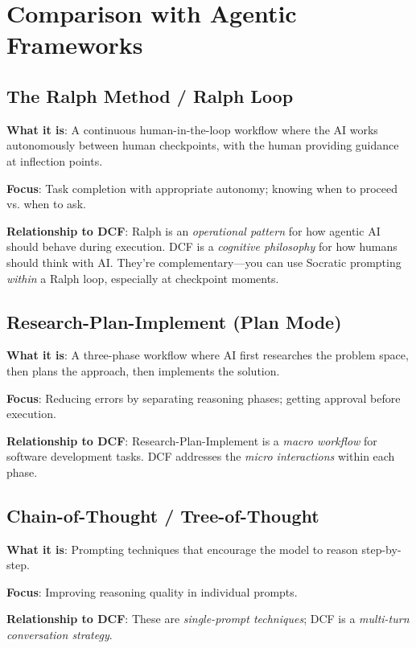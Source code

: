 \chapter{Comparison with Agentic Frameworks}

\section{The Ralph Method / Ralph Loop}

\textbf{What it is}: A continuous human-in-the-loop workflow where the AI works autonomously between human checkpoints, with the human providing guidance at inflection points.

\textbf{Focus}: Task completion with appropriate autonomy; knowing when to proceed vs. when to ask.

\textbf{Relationship to DCF}: Ralph is an \emph{operational pattern} for how agentic AI should behave during execution. DCF is a \emph{cognitive philosophy} for how humans should think with AI. They're complementary---you can use Socratic prompting \emph{within} a Ralph loop, especially at checkpoint moments.

\section{Research-Plan-Implement (Plan Mode)}

\textbf{What it is}: A three-phase workflow where AI first researches the problem space, then plans the approach, then implements the solution.

\textbf{Focus}: Reducing errors by separating reasoning phases; getting approval before execution.

\textbf{Relationship to DCF}: Research-Plan-Implement is a \emph{macro workflow} for software development tasks. DCF addresses the \emph{micro interactions} within each phase.

\section{Chain-of-Thought / Tree-of-Thought}

\textbf{What it is}: Prompting techniques that encourage the model to reason step-by-step.

\textbf{Focus}: Improving reasoning quality in individual prompts.

\textbf{Relationship to DCF}: These are \emph{single-prompt techniques}; DCF is a \emph{multi-turn conversation strategy}.

